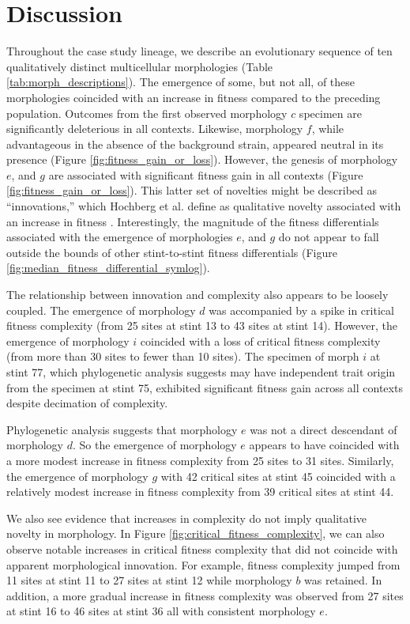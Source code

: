 \section{Discussion}

Throughout the case study lineage, we describe an evolutionary sequence of ten qualitatively distinct multicellular morphologies (Table \ref{tab:morph_descriptions}).
The emergence of some, but not all, of these morphologies coincided with an increase in fitness compared to the preceding population.
Outcomes from the first observed morphology $c$ specimen are significantly deleterious in all contexts.
Likewise, morphology $f$, while advantageous in the absence of the background strain, appeared neutral in its presence (Figure \ref{fig:fitness_gain_or_loss}).
However, the genesis of morphology $e$, and $g$ are associated with significant fitness gain in all contexts (Figure \ref{fig:fitness_gain_or_loss}).
This latter set of novelties might be described as ``innovations,'' which Hochberg et al. define as qualitative novelty associated with an increase in fitness \citep{hochberg2017innovation}.
Interestingly, the magnitude of the fitness differentials associated with the emergence of morphologies $e$, and $g$ do not appear to fall outside the bounds of other stint-to-stint fitness differentials (Figure \ref{fig:median_fitness_differential_symlog}).

The relationship between innovation and complexity also appears to be loosely coupled.
The emergence of morphology $d$ was accompanied by a spike in critical fitness complexity (from 25 sites at stint 13 to 43 sites at stint 14).
However, the emergence of morphology $i$ coincided with a loss of critical fitness complexity (from more than 30 sites to fewer than 10 sites).
The specimen of morph $i$ at stint 77, which phylogenetic analysis suggests may have independent trait origin from the specimen at stint 75, exhibited significant fitness gain across all contexts despite decimation of complexity.

Phylogenetic analysis suggests that morphology $e$ was not a direct descendant of morphology $d$.
So the emergence of morphology $e$ appears to have coincided with a more modest increase in fitness complexity from 25 sites to 31 sites.
Similarly, the emergence of morphology $g$ with 42 critical sites at stint 45 coincided with a relatively modest increase in fitness complexity from 39 critical sites at stint 44.

We also see evidence that increases in complexity do not imply qualitative novelty in morphology.
In Figure \ref{fig:critical_fitness_complexity}, we can also observe notable increases in critical fitness complexity that did not coincide with apparent morphological innovation.
For example, fitness complexity jumped from 11 sites at stint 11 to 27 sites at stint 12 while morphology $b$ was retained.
In addition, a more gradual increase in fitness complexity was observed from 27 sites at stint 16 to 46 sites at stint 36 all with consistent morphology $e$.

